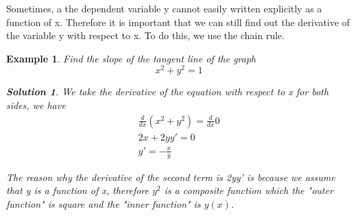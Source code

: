 \documentclass{article}
\newtheorem{ex}{Example}
\newtheorem*{solution}{Solution}
\begin{document}
Sometimes, a the dependent variable y cannot easily written explicitly as a function of x. Therefore it is important that we can still find out the derivative of the variable y with respect to x. To do this, we use the chain rule.


\begin{ex}
    Find the slope of the tangent line of the graph
    \[ x^2+y^2 = 1 \]

    \begin{solution}
    We take the derivative of the equation with respect to x for both sides, we have
    \begin{align*}
        \frac{d}{dx} (x^2+y^2) = \frac{d}{dx}0\\
        2x + 2yy' = 0\\
        y' = -\frac{x}{y}
    \end{align*}

    The reason why the derivative of the second term is 2yy' is because we assume that y is a function of x, therefore $y^2$ is a composite function which the "outer function" is square and the "inner function" is $y(x)$.  
    \end{solution}
\end{ex}
\end{document}
